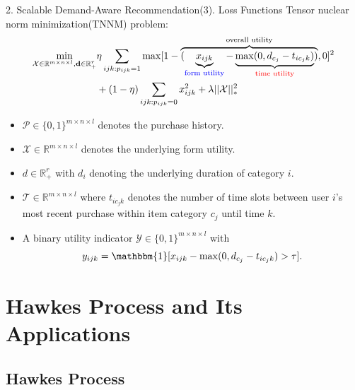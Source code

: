 \documentclass[professionalfonts]{beamer}
\begin{document}
\begin{frame}{2. Scalable Demand-Aware Recommendation}{(3). Loss Functions}
Tensor nuclear norm minimization(TNNM) problem:
\begin{equation*}
\begin{split}
	 \min_{\mathcal{X}\in \mathbb{R}^{m\times n \times l}, \mathbf{d}\in \mathbb{R}^r_+} &
	\eta \sum_{ijk: p_{ijk} = 1}  \max[1 - \overbrace{(\underbrace{x_{ijk}}_{\color{blue} \text{form utility}} - \underbrace{\max(0, d_{c_j}-t_{i c_j k})}_{\color{red} \text{time utility}})}^\text{overall utility}, 0]^2 \\
	& + (1 - \eta) \sum_{ijk: p_{ijk}=0} x_{ijk}^2 + 	\lambda ||\mathcal{X}||^2_*
\end{split}
\end{equation*}

\begin{itemize}
	\item $\mathcal{P} \in  \{0, 1\}^{m\times n \times l}$ denotes the purchase history. 
	\item $\mathcal{X} \in \mathbb{R}^{m \times n \times l }$ denotes the {\color{lbrown} underlying} form utility.
	\item $d \in  \mathbb{R}_+^r$ with $d_i$ denoting the {\color{lbrown} underlying} duration of category $i$.
	\item $\mathcal{T} \in \mathbb{R}^{m \times n \times l}$ where $t_{ic_jk}$ denotes the number of time slots between user $i$'s most recent purchase within item category $c_j$ until time $k$.
	\item A binary utility indicator $\mathcal{Y} \in \{0, 1\}^{m \times n \times l}$ with $$y_{ijk} = \mathbbm{1}[x_{ijk} - \max (0, d_{c_j} - t_{i c_j k}) > \tau].$$
\end{itemize}
\end{frame}

\section{Hawkes Process and Its Applications}
\subsection{Hawkes Process}
\end{document}
